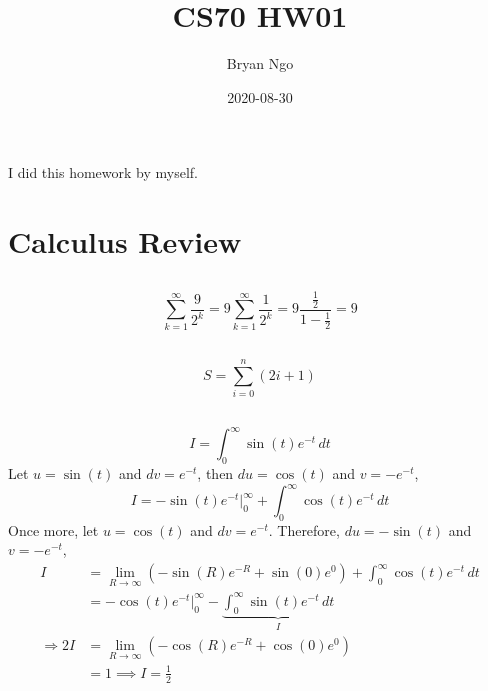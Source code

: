 \documentclass{article}
\title{CS70 HW01}
\author{Bryan Ngo}
\date{2020-08-30}
\begin{document}
\maketitle

I did this homework by myself.

\section{Calculus Review}

\subsection{}

\begin{equation}
    \sum_{k = 1}^\infty \frac{9}{2^k} = 9 \sum_{k = 1}^\infty \frac{1}{2^k} = 9 \frac{\frac{1}{2}}{1 - \frac{1}{2}} = 9
\end{equation}

\subsection{}

\begin{equation}
    S = \sum_{i = 0}^n (2i + 1)
\end{equation}

\subsection{}

\begin{equation}
    I = \int_0^{\infty} \sin(t) e^{-t} \, dt
\end{equation}
Let \(u = \sin(t)\) and \(dv = e^{-t}\), then \(du = \cos(t)\) and \(v = -e^{-t}\),
\begin{equation}
    I = -\sin(t) e^{-t}|_0^\infty + \int_0^\infty \cos(t) e^{-t} \, dt
\end{equation}
Once more, let \(u = \cos(t)\) and \(dv = e^{-t}\).
Therefore, \(du = -\sin(t)\) and \(v = -e^{-t}\),
\begin{align}
    I &= \lim_{R \to \infty} (-\sin(R) e^{-R} + \sin(0) e^{0}) + \int_0^\infty \cos(t) e^{-t} \, dt \\
    &= -\cos(t) e^{-t}|_0^\infty - \underbrace{\int_0^\infty \sin(t) e^{-t} \, dt}_I \\
    \Rightarrow 2I &= \lim_{R \to \infty} (-\cos(R) e^{-R} + \cos(0) e^0) \\
    &= 1 \implies I = \frac{1}{2}
\end{align}
\end{document}
